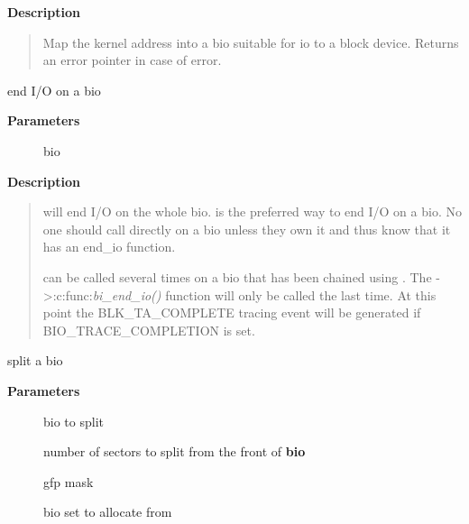 \documentclass[a4paper,8pt,english]{sphinxmanual}
\begin{document}
\textbf{Description}
\begin{quote}

Map the kernel address into a bio suitable for io to a block
device. Returns an error pointer in case of error.
\end{quote}

\begin{fulllineitems}
\label{filesystems/index:c.bio_endio}
end I/O on a bio

\end{fulllineitems}


\textbf{Parameters}
\begin{description}
\item[{}] \leavevmode
bio

\end{description}

\textbf{Description}
\begin{quote}

{\hyperref[filesystems/index:c.bio_endio]{\emph{}}} will end I/O on the whole bio. {\hyperref[filesystems/index:c.bio_endio]{\emph{}}} is the preferred
way to end I/O on a bio. No one should call  directly on a
bio unless they own it and thus know that it has an end\_io function.

{\hyperref[filesystems/index:c.bio_endio]{\emph{}}} can be called several times on a bio that has been chained
using {\hyperref[filesystems/index:c.bio_chain]{\emph{}}}.  The -\textgreater{}:c:func:\emph{bi\_end\_io()} function will only be called the
last time.  At this point the BLK\_TA\_COMPLETE tracing event will be
generated if BIO\_TRACE\_COMPLETION is set.
\end{quote}

\begin{fulllineitems}
\label{filesystems/index:c.bio_split}
split a bio

\end{fulllineitems}


\textbf{Parameters}
\begin{description}
\item[{}] \leavevmode
bio to split

\item[{}] \leavevmode
number of sectors to split from the front of \textbf{bio}

\item[{}] \leavevmode
gfp mask

\item[{}] \leavevmode
bio set to allocate from

\end{description}
\end{document}
